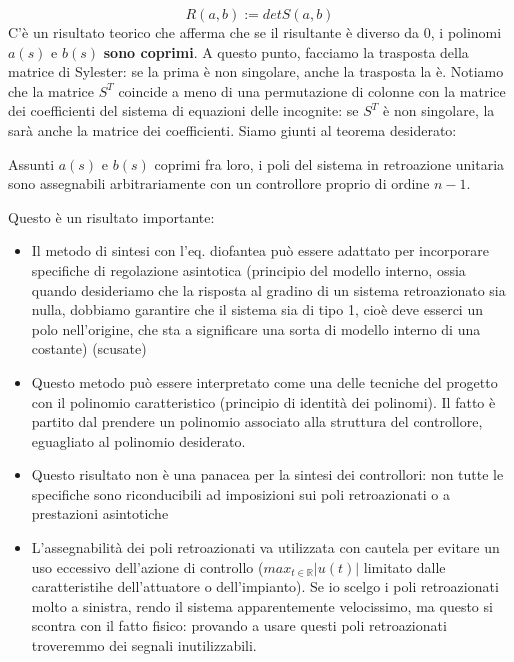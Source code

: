\documentclass[11pt]{article}
\begin{document}
\begin{displaymath}
    R(a,b):=det S(a,b)
\end{displaymath}
C'è un risultato teorico che afferma che se il risultante è diverso da 0, i polinomi $a(s)$ e $b(s)$ \textbf{sono coprimi}. A questo punto, facciamo la trasposta della matrice di Sylester: se la prima è non singolare, anche la trasposta la è. Notiamo che la matrice $S^T$ coincide a meno di una permutazione di colonne con la matrice dei coefficienti del sistema di equazioni delle incognite: se $S^T$ è non singolare, la sarà anche la matrice dei coefficienti. Siamo giunti al teorema desiderato:
\begin{center}
    Assunti $a(s)$ e $b(s)$ coprimi fra loro, i poli del sistema in retroazione unitaria sono assegnabili arbitrariamente con un controllore proprio di ordine $n-1$.
\end{center}
Questo è un risultato importante:
\begin{itemize}
    \item Il metodo di sintesi con l'eq. diofantea può essere adattato per incorporare specifiche di regolazione asintotica (principio del modello interno, ossia quando desideriamo che la risposta al gradino di un sistema retroazionato sia nulla, dobbiamo garantire che il sistema sia di tipo 1, cioè deve esserci un polo nell'origine, che sta a significare una sorta di modello interno di una costante) (scusate)
    \item Questo metodo può essere interpretato come una delle tecniche del progetto con il polinomio caratteristico (principio di identità dei polinomi). Il fatto è partito dal prendere un polinomio associato alla struttura del controllore, eguagliato al polinomio desiderato.
    \item Questo risultato non è una panacea per la sintesi dei controllori: non tutte le specifiche sono riconducibili ad imposizioni sui poli retroazionati o a prestazioni asintotiche
    \item L'assegnabilità dei poli retroazionati va utilizzata con cautela per evitare un uso eccessivo dell'azione di controllo ($max_{t\in\mathbb{R}}|u(t)|$ limitato dalle caratteristihe dell'attuatore o dell'impianto). Se io scelgo i poli retroazionati molto a sinistra, rendo il sistema apparentemente velocissimo, ma questo si scontra con il fatto fisico: provando a usare questi poli retroazionati troveremmo dei segnali inutilizzabili.
\end{itemize}
\end{document}

